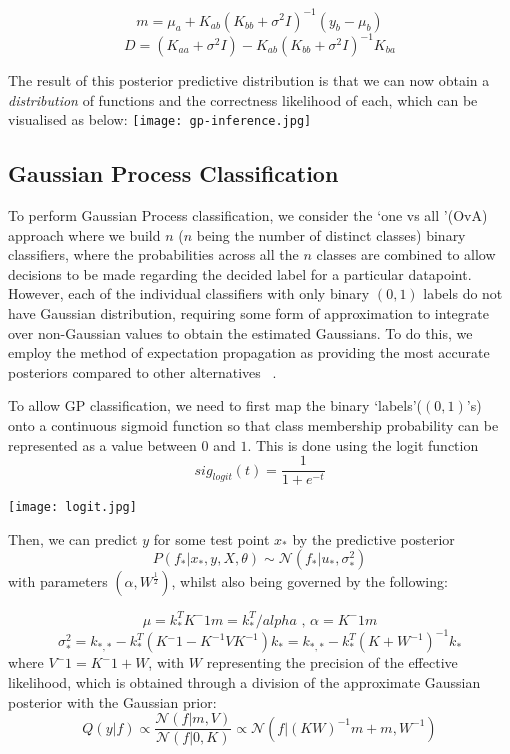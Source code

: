 \documentclass[journal]{IEEEtran}
\begin{document}
    $$ m = \mu_a + K_{ab} (K_{bb} + \sigma^2I)^{-1} (y_b - \mu_b) $$
    $$ D = (K_{aa} + \sigma^2I) - K_{ab} (K_{bb}+\sigma^2I)^{-1} K_{ba} $$

    The result of this posterior predictive distribution is that we can now obtain a \textit{distribution} of functions and the correctness likelihood of each, which can be visualised as below:
    \texttt{[image: gp-inference.jpg]}

    \subsection{Gaussian Process Classification} 
    To perform Gaussian Process classification, we consider the \lq one vs all \rq (OvA) approach where we build $n$ ($n$ being the number of distinct classes) binary classifiers, where the probabilities across all the $n$ classes are combined to allow decisions to be made regarding the decided label for a particular datapoint. However, each of the individual classifiers with only binary $(0, 1)$ labels do not have Gaussian distribution, requiring some form of approximation to integrate over non-Gaussian values to obtain the estimated Gaussians. To do this, we employ the method of expectation propagation as providing the most accurate posteriors compared to other alternatives ~\citep{nickisch08}. 

    To allow GP classification, we need to first map the binary \lq labels\rq ($(0, 1)$'s) onto a continuous sigmoid function so that class membership probability can be represented as a value between $0$ and $1$. This is done using the logit function $$sig_{logit}(t) = \frac{1}{1+e^{-t}}$$


    \texttt{[image: logit.jpg]}

    Then, we can predict $y$ for some test point $x_*$ by the predictive posterior $$P(f_* | x_*, y, X, \theta) \sim \mathcal{N}(f_* | u_*, \sigma^2_*)$$
    with parameters $(\alpha, W^{\frac{1}{2}})$, whilst also being governed by the following:

    $$\mu = k^T_*K^-1m = k^T_*/alpha \textrm{ ,     } \alpha = K^-1m $$
    $$ \sigma^2_* = k_{*,*} - k^T_*(K{^-1}-K^{-1}VK^{-1})k_* = k_{*,*} - k^T_*(K+W^{-1})^{-1}k_*$$
    where $ V^-1 = K^-1 + W$, with $W$ representing the precision of the effective likelihood, which is obtained through a division of the approximate Gaussian posterior with the Gaussian prior:
    $$ Q(y|f) \propto \frac{\mathcal{N}(f|m, V)}{\mathcal{N}(f|0,K)} \propto \mathcal{N}(f | (KW)^{-1} m + m, W^{-1})$$
    
\end{document}
